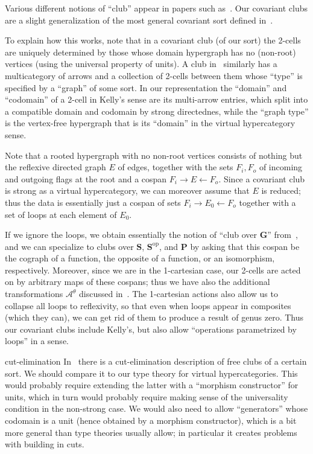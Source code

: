 \documentclass{article}
\theoremstyle{definition}
\theoremstyle{remark}
\def\op{^{\mathrm{op}}}
\let\ot\leftarrow
\begin{document}
Various different notions of ``club'' appear in papers such as~\cite{kelly:mv-funct-calc,kelly:abst-coh,kelly:club-doc,kelly:club-dt}.
Our covariant clubs are a slight generalization of the most general covariant sort defined in~\cite{kelly:mv-funct-calc,kelly:abst-coh}.

To explain how this works, note that in a covariant club (of our sort) the 2-cells are uniquely determined by those whose domain hypergraph has no (non-root) vertices (using the universal property of units).
A club in~\cite{kelly:abst-coh} similarly has a multicategory of arrows and a collection of 2-cells between them whose ``type'' is specified by a ``graph'' of some sort.
In our representation the ``domain'' and ``codomain'' of a 2-cell in Kelly's sense are its multi-arrow entries, which split into a compatible domain and codomain by strong directednes, while the ``graph type'' is the vertex-free hypergraph that is its ``domain'' in the virtual hypercategory sense.

Note that a rooted hypergraph with no non-root vertices consists of nothing but the reflexive directed graph $E$ of edges, together with the sets $F_i, F_o$ of incoming and outgoing flags at the root and a cospan $F_i \to E \ot F_o$.
Since a covariant club is strong as a virtual hypercategory, we can moreover assume that $E$ is reduced; thus the data is essentially just a cospan of sets $F_i \to E_0 \ot F_o$ together with a set of loops at each element of $E_0$.

If we ignore the loops, we obtain essentially the notion of ``club over $\mathbf{G}$'' from~\cite{kelly:mv-funct-calc,kelly:abst-coh}, and we can specialize to clubs over $\mathbf{S}$, $\mathbf{S}\op$, and $\mathbf{P}$ by asking that this cospan be the cograph of a function, the opposite of a function, or an isomorphism, respectively.
Moreover, since we are in the 1-cartesian case, our 2-cells are acted on by arbitrary maps of these cospans; thus we have also the additional transformations $\mathcal{A}^\theta$ discussed in~\cite[\S4.1]{kelly:mv-funct-calc}.
The 1-cartesian actions also allow us to collapse all loops to reflexivity, so that even when loops appear in composites (which they can), we can get rid of them to produce a result of genus zero.
Thus our covariant clubs include Kelly's, but also allow ``operations parametrized by loops'' in a sense.

\begin{anfxnote}{cut-elimination}
In~\cite{kelly:abst-coh} there is a cut-elimination description of free clubs of a certain sort.
We should compare it to our type theory for virtual hypercategories.
This would probably require extending the latter with a ``morphism constructor'' for units, which in turn would probably require making sense of the universality condition in the non-strong case.
We would also need to allow ``generators'' whose codomain is a unit (hence obtained by a morphism constructor), which is a bit more general than type theories usually allow; in particular it creates problems with building in cuts.
\end{anfxnote}
\end{document}
